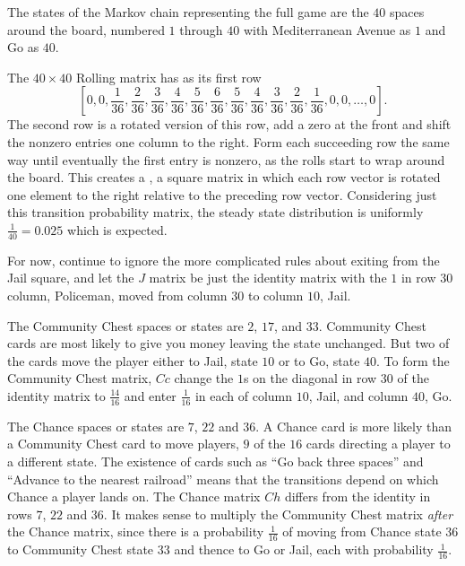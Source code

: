 \documentclass[12pt]{article}
\begin{document}
The states of the Markov chain representing the full game are the \( 40 \)
spaces around the board, numbered \( 1 \) through \( 40 \) with
Mediterranean Avenue as \( 1 \) and Go as \( 40 \).

The \( 40 \times 40 \) Rolling matrix has as its first row
\[
    [0, 0, \frac{1}{36}, \frac{2}{36},\frac{3}{36},\frac{4}{36},\frac{5}
    {36},\frac{6}{36}, \frac{5}{36},\frac{4}{36},\frac{3}{36},\frac{2}{36},\frac
    {1}{36}, 0, 0, \dots, 0].
\] The second row is a rotated version of this row, add a zero at the
front and shift the nonzero entries one column to the right.  Form each
succeeding row the same way until eventually the first entry is nonzero,
as the rolls start to wrap around the board.  This creates a , a square matrix in which each row vector is rotated one element
to the right relative to the preceding row vector. Considering just this
transition probability matrix, the steady state distribution is
uniformly \( \frac{1}{40} = 0.025 \) which is expected.

For now, continue to ignore the more complicated rules about exiting
from the Jail square, and let the \( J \) matrix be just the identity
matrix with the \( 1 \) in row \( 30 \) column, Policeman, moved from
column \( 30 \) to column \( 10 \), Jail.

The Community Chest spaces or states are \( 2 \), \( 17 \), and \( 33 \).
Community Chest cards are most likely to give you money leaving the
state unchanged.  But two of the cards move the player either to Jail,
state \( 10 \) or to Go, state \( 40 \).  To form the Community Chest
matrix, \( \mathit{Cc} \) change the \( 1 \)s on the diagonal in
row \( 30 \) of the identity matrix to \( \frac{14}{16} \) and enter \(
\frac{1}{16} \) in each of column \( 10 \), Jail, and column \( 40 \),
Go.

The Chance spaces or states are \( 7 \), \( 22 \) and \( 36 \).  A
Chance card is more likely than a Community Chest card to move players, \(
9 \) of the \( 16 \) cards directing a player to a different state.  The
existence of cards such as ``Go back three spaces'' and ``Advance to the
nearest railroad'' means that the transitions depend on which Chance a
player lands on.  The Chance matrix \( \mathit{Ch} \) differs from the
identity in rows \( 7 \), \( 22 \) and \( 36 \).  It makes sense to
multiply the Community Chest matrix \emph{after} the Chance matrix,
since there is a probability \( \frac{1}{16} \) of moving from Chance
state \( 36 \) to Community Chest state \( 33 \) and thence to Go or
Jail, each with probability \( \frac{1}{16} \).
\end{document}
